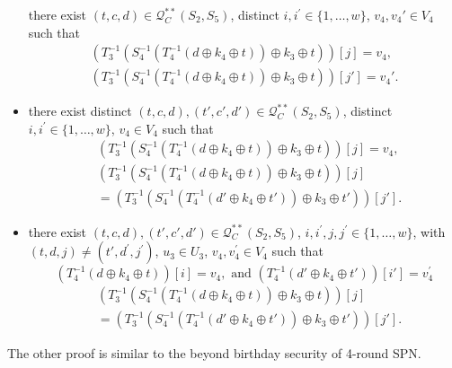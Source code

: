 \begin{itemize}
  there exist $(t, c, d) \in \mathcal{Q}_{C}^{**}\left(S_{2}, S_{5}\right)$, distinct $i, i^{\prime}\in\{1, \ldots, w\}$, $v_{4},v_{4}' \in V_{4}$ such that
  $$
  \begin{aligned}  
  \left(T_{3}^{-1}\left(S_{4}^{-1}\left(T_{4}^{-1}\left(d \oplus k_{4} \oplus t\right)\right) \oplus k_{3} \oplus t\right)\right)[j] = v_4, \\
  \left(T_{3}^{-1}\left(S_{4}^{-1}\left(T_{4}^{-1}\left(d \oplus k_{4} \oplus t\right)\right) \oplus k_{3} \oplus t\right)\right)[j'] = v_4'.
  \end{aligned}
  $$
  \item[\feaviii]
  there exist distinct $(t, c, d),(t', c', d') \in \mathcal{Q}_{C}^{**}\left(S_{2}, S_{5}\right)$, distinct $i, i^{\prime}\in\{1, \ldots, w\}$, $v_{4} \in V_{4}$ such that
  $$
  \begin{aligned}
  &\left(T_{3}^{-1}\left(S_{4}^{-1}\left(T_{4}^{-1}\left(d \oplus k_{4} \oplus t\right)\right) \oplus k_{3} \oplus t\right)\right)[j] = v_4, \\
  &\left(T_{3}^{-1}\left(S_{4}^{-1}\left(T_{4}^{-1}\left(d \oplus k_{4} \oplus t\right)\right) \oplus k_{3} \oplus t\right)\right)[j]\\
  &=\left(T_{3}^{-1}\left(S_{4}^{-1}\left(T_{4}^{-1}\left(d' \oplus k_{4} \oplus t'\right)\right) \oplus k_{3} \oplus t'\right)\right)[j'].
  \end{aligned}
  $$
  \item[\feaviiii]
  there exist $(t, c, d), (t', c', d') \in \mathcal{Q}_{C}^{**}\left(S_{2}, S_{5}\right)$, $i, i^{\prime}, j, j^{\prime} \in\{1, \ldots, w\}$, with$(t, d, j) \neq \left(t', d^{\prime}, j^{\prime}\right)$, $u_{3} \in U_{3}$, $v_{4},v_{4}^{\prime} \in V_{4}$ such that 
  $$
  \left(T_{4}^{-1}\left(d \oplus k_{4} \oplus t\right)\right)[i] = v_4, \text{ and }
  \left(T_{4}^{-1}\left(d' \oplus k_{4} \oplus t'\right)\right)[i'] = v_4^{\prime}
  $$ 
  $$
\begin{aligned}
  &\left(T_{3}^{-1}\left(S_{4}^{-1}\left(T_{4}^{-1}\left(d \oplus k_{4} \oplus t\right)\right) \oplus k_{3} \oplus t\right)\right)[j] \\
  &=  \left(T_{3}^{-1}\left(S_{4}^{-1}\left(T_{4}^{-1}\left(d' \oplus k_{4} \oplus t'\right)\right) \oplus k_{3} \oplus t'\right)\right)[j'].
\end{aligned}
$$
\end{itemize}


\noindent The other proof is similar to the beyond birthday security of 4-round SPN. 



















